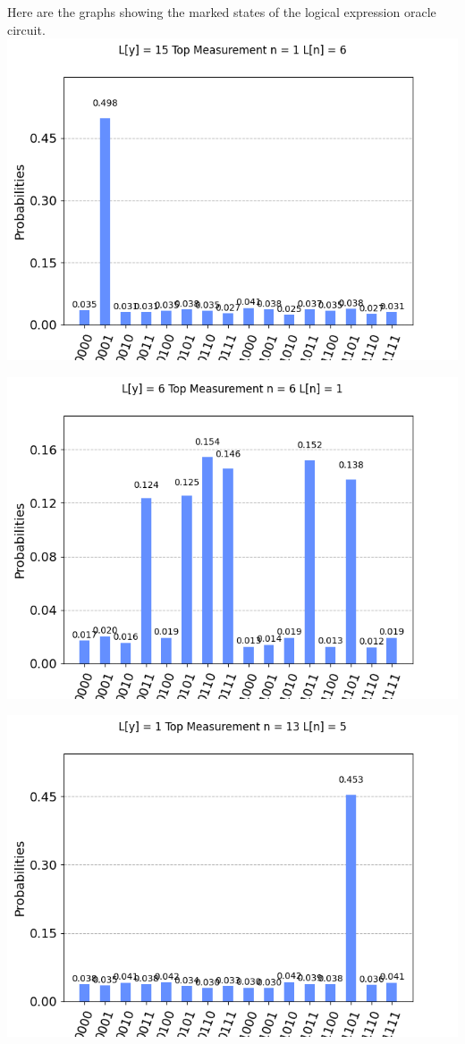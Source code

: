 \documentclass[11pt]{article}
\begin{document}
\newpage
Here are the graphs showing the marked states of the logical expression oracle circuit.
\includegraphics[width=\textwidth]{logical_0.png}
\centering

\includegraphics[width=\textwidth]{logical_1.png}
\centering

\includegraphics[width=\textwidth]{logical_2.png}
\centering
\end{document}
